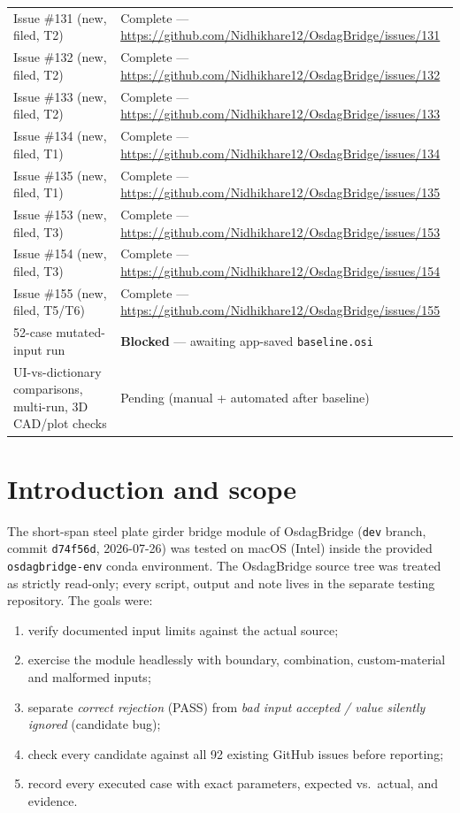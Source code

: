 \documentclass[11pt,a4paper]{article}
\begin{document}
\begin{tabular}{@{}ll@{}}
Issue \#131 (new, filed, T2) & Complete --- \url{https://github.com/Nidhikhare12/OsdagBridge/issues/131} \\
Issue \#132 (new, filed, T2) & Complete --- \url{https://github.com/Nidhikhare12/OsdagBridge/issues/132} \\
Issue \#133 (new, filed, T2) & Complete --- \url{https://github.com/Nidhikhare12/OsdagBridge/issues/133} \\
Issue \#134 (new, filed, T1) & Complete --- \url{https://github.com/Nidhikhare12/OsdagBridge/issues/134} \\
Issue \#135 (new, filed, T1) & Complete --- \url{https://github.com/Nidhikhare12/OsdagBridge/issues/135} \\
Issue \#153 (new, filed, T3) & Complete --- \url{https://github.com/Nidhikhare12/OsdagBridge/issues/153} \\
Issue \#154 (new, filed, T3) & Complete --- \url{https://github.com/Nidhikhare12/OsdagBridge/issues/154} \\
Issue \#155 (new, filed, T5/T6) & Complete --- \url{https://github.com/Nidhikhare12/OsdagBridge/issues/155} \\
52-case mutated-input run & \textbf{Blocked} --- awaiting app-saved \texttt{baseline.osi} \\
UI-vs-dictionary comparisons, multi-run, 3D CAD/plot checks & Pending (manual + automated after baseline) \\
\bottomrule
\end{tabular}

\section{Introduction and scope}
The short-span steel plate girder bridge module of OsdagBridge (\texttt{dev} branch, commit \texttt{d74f56d}, 2026-07-26) was tested on macOS (Intel) inside the provided \texttt{osdagbridge-env} conda environment. The OsdagBridge source tree was treated as strictly read-only; every script, output and note lives in the separate testing repository. The goals were:

\begin{enumerate}[nosep]
  \item verify documented input limits against the actual source;
  \item exercise the module headlessly with boundary, combination, custom-material and malformed inputs;
  \item separate \emph{correct rejection} (PASS) from \emph{bad input accepted / value silently ignored} (candidate bug);
  \item check every candidate against all 92 existing GitHub issues before reporting;
  \item record every executed case with exact parameters, expected vs.\ actual, and evidence.
\end{enumerate}
\end{document}
